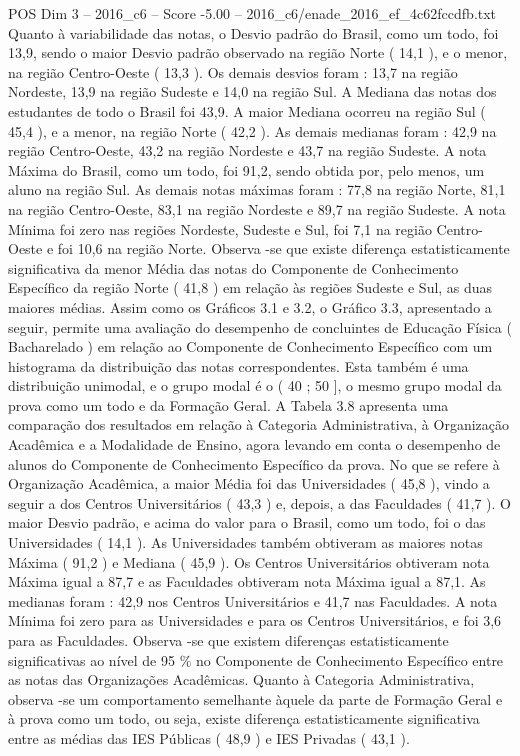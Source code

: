 \begin{textsample}{POS Dim 3 – 2016\_c6 – Score -5.00 – 2016\_c6/enade\_2016\_ef\_4c62fccdfb.txt}
Quanto à variabilidade das notas, o Desvio padrão do Brasil, como um todo, foi 13,9, sendo o maior Desvio padrão observado na região Norte ( 14,1 ), e o menor, na região Centro-Oeste ( 13,3 ).
Os demais desvios foram : 13,7 na região Nordeste, 13,9 na região Sudeste e 14,0 na região Sul.
A Mediana das notas dos estudantes de todo o Brasil foi 43,9.
A maior Mediana ocorreu na região Sul ( 45,4 ), e a menor, na região Norte ( 42,2 ).
As demais medianas foram : 42,9 na região Centro-Oeste, 43,2 na região Nordeste e 43,7 na região Sudeste.
A nota Máxima do Brasil, como um todo, foi 91,2, sendo obtida por, pelo menos, um aluno na região Sul.
As demais notas máximas foram : 77,8 na região Norte, 81,1 na região Centro-Oeste, 83,1 na região Nordeste e 89,7 na região Sudeste.
A nota Mínima foi zero nas regiões Nordeste, Sudeste e Sul, foi 7,1 na região Centro-Oeste e foi 10,6 na região Norte.
Observa -se que existe diferença estatisticamente significativa da menor Média das notas do Componente de Conhecimento Específico da região Norte ( 41,8 ) em relação às regiões Sudeste e Sul, as duas maiores médias.
Assim como os Gráficos 3.1 e 3.2, o Gráfico 3.3, apresentado a seguir, permite uma avaliação do desempenho de concluintes de Educação Física ( Bacharelado ) em relação ao Componente de Conhecimento Específico com um histograma da distribuição das notas correspondentes.
Esta também é uma distribuição unimodal, e o grupo modal é o ( 40 ; 50 ], o mesmo grupo modal da prova como um todo e da Formação Geral.
A Tabela 3.8 apresenta uma comparação dos resultados em relação à Categoria Administrativa, à Organização Acadêmica e a Modalidade de Ensino, agora levando em conta o desempenho de alunos do Componente de Conhecimento Específico da prova.
No que se refere à Organização Acadêmica, a maior Média foi das Universidades ( 45,8 ), vindo a seguir a dos Centros Universitários ( 43,3 ) e, depois, a das Faculdades ( 41,7 ).
O maior Desvio padrão, e acima do valor para o Brasil, como um todo, foi o das Universidades ( 14,1 ).
As Universidades também obtiveram as maiores notas Máxima ( 91,2 ) e Mediana ( 45,9 ).
Os Centros Universitários obtiveram nota Máxima igual a 87,7 e as Faculdades obtiveram nota Máxima igual a 87,1.
As medianas foram : 42,9 nos Centros Universitários e 41,7 nas Faculdades.
A nota Mínima foi zero para as Universidades e para os Centros Universitários, e foi 3,6 para as Faculdades.
Observa -se que existem diferenças estatisticamente significativas ao nível de 95 \% no Componente de Conhecimento Específico entre as notas das Organizações Acadêmicas.
Quanto à Categoria Administrativa, observa -se um comportamento semelhante àquele da parte de Formação Geral e à prova como um todo, ou seja, existe diferença estatisticamente significativa entre as médias das IES Públicas ( 48,9 ) e IES Privadas ( 43,1 ).

\end{textsample}
